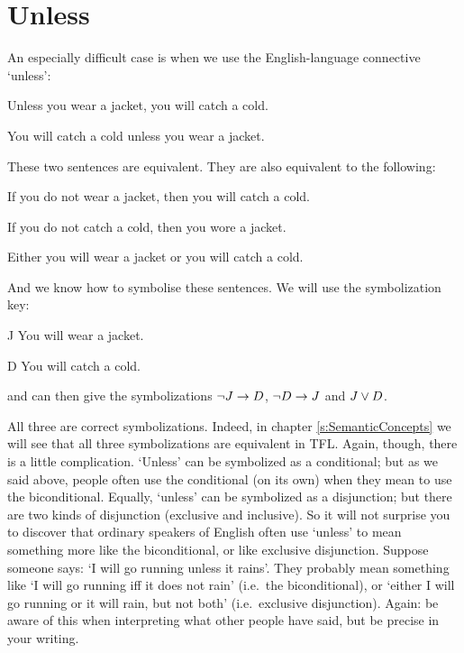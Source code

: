 \section{Unless}
An especially difficult case is when we use the English-language connective `unless':

\begin{earg}
\item[\ex{unless1}] Unless you wear a jacket, you will catch a cold. 
\item[\ex{unless2}] You will catch a cold unless you wear a jacket. 
\end{earg}
These two sentences are equivalent. They are also equivalent to the following: 
\begin{earg}
\item[\ex{unless3}]  If you do not wear a jacket, then you will catch a cold.
\item[\ex{unless4}]  If you do not catch a cold, then you wore a jacket.
\item [\ex{unless5}] Either you will wear a jacket or you will catch a cold.
\end{earg} 
And we know how to symbolise these sentences. We will use the symbolization key:
	\begin{ekey}
		\item[J] You will wear a jacket.
		\item[D] You will catch a cold.
	\end{ekey} and can then give the symbolizations $\neg J \rightarrow D$, $\neg D \rightarrow J$ and $J \vee D$.

All three are correct symbolizations. Indeed, in chapter \ref{s:SemanticConcepts} we will see that all three symbolizations are equivalent in TFL.
Again, though, there is a little complication. `Unless' can be symbolized as a conditional; but as we said above, people often use the conditional (on its own) when they mean to use the biconditional. Equally, `unless' can be symbolized as a disjunction; but there are two kinds of disjunction (exclusive and inclusive). So it will not surprise you to discover that ordinary speakers of English often use `unless' to mean something more like the biconditional, or like exclusive disjunction. Suppose someone says: `I will go running unless it rains'. They probably mean something like `I will go running iff it does not rain' (i.e.\ the biconditional), or  `either I will go running or it will rain, but not both' (i.e.\ exclusive disjunction). Again: be aware of this when interpreting what other people have said, but be precise in your writing.

